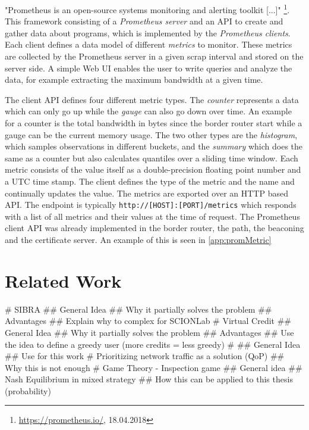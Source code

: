 \documentclass[thesis.tex]{subfiles}
\begin{document}
"Prometheus is an open-source systems monitoring and alerting toolkit [...]" \footnote{\url{https://prometheus.io/}, 18.04.2018}. This framework consisting of a \textit{Prometheus server} and an API to create and gather data about programs, which is implemented by the \textit{Prometheus clients}. Each client defines a data model of different \textit{metrics} to monitor. These metrics are collected by the Prometheus server in a given scrap interval and stored on the server side. A simple Web UI enables the user to write queries and analyze the data, for example extracting the maximum bandwidth at a given time.

The client API defines four different metric types. The \textit{counter} represents a data which can only go up while the \textit{gauge} can also go down over time. An example for a counter is the total bandwidth in bytes since the border router start while a gauge can be the current memory usage. The two other types are the \textit{histogram}, which samples observations in different buckets, and the \textit{summary} which does the same as a counter but also calculates quantiles over a sliding time window. Each metric consists of the value itself as a double-precision floating point number and a UTC time stamp. The client defines the type of the metric and the name and continually updates the value. The metrics are exported over an HTTP based API. The endpoint is typically {\lstinline|http://[HOST]:[PORT]/metrics|} which responds with a list of all metrics and their values at the time of request. The Prometheus client API was already implemented in the border router, the path, the beaconing and the certificate server. An example of this is seen in \autoref{app:promMetric}

\section{Related Work}\label{chap:prevwork}

\begin{easylist}
	\MyListProperties
	# SIBRA \cite{Basescu.2016}
	## General Idea
	## Why it partially solves the problem
	## Advantages
	## Explain why to complex for SCIONLab
	# Virtual Credit \cite{DennisMeyer.2017}
	## General Idea
	## Why it partially solves the problem
	## Advantages
	## Use the idea to define a greedy user (more credits = less greedy)
	# \cite{Zhu.2014}
	## General Idea
	## Use for this work
	# Prioritizing network traffic as a solution (QoP)
	## Why this is not enough 
	# Game Theory - Inspection game
	## General idea
	## Nash Equilibrium in mixed strategy
	## How this can be applied to this thesis (probability)
\end{easylist}

\subfilebib %
\end{document}
